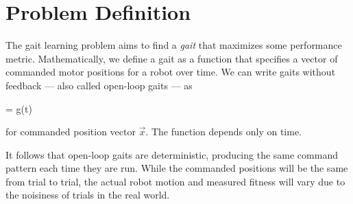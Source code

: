 \section{Problem Definition}

%
%
%
%
%


The gait learning problem aims to find a \emph{gait} that maximizes
some performance metric. Mathematically, we define a gait as a function that specifies
a vector of commanded motor positions for a robot over time.
We can write gaits without feedback --- also called open-loop gaits --- as

\be
{} = g(t)
\ee

\noindent for commanded position vector $\vec{x}$.  The
function depends only on time.

%
%

It follows that open-loop gaits are deterministic, producing the
same command pattern each time they are run.  While the commanded
positions will be the same from trial to trial, the actual robot
motion and measured fitness will vary due to the noisiness of trials
in the real world.

